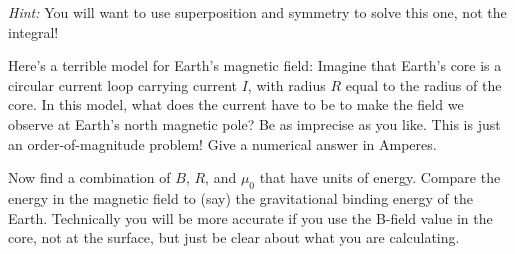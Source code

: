 \documentclass[12pt]{article}
\begin{document}
\textit{Hint:} You will want to use superposition and symmetry to
solve this one, not the integral!

\startproblem%
Here's a terrible model for Earth's magnetic field: Imagine that
Earth's core is a circular current loop carrying current $I$, with
radius $R$ equal to the radius of the core. In this model, what does
the current have to be to make the field we observe at Earth's
north magnetic pole? Be as imprecise as you like. This is just an
order-of-magnitude problem! Give a numerical answer in Amperes.

Now find a combination of $B$, $R$, and $\mu_0$
that have units of energy. Compare the energy in the magnetic field
to (say) the gravitational binding energy of the Earth. Technically
you will be more accurate if you use the B-field value in the core,
not at the surface, but just be clear about what you are calculating.
\end{document}
